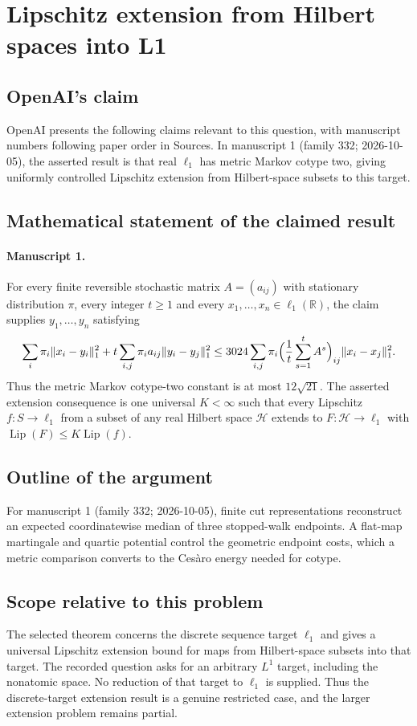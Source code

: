\documentclass[11pt]{article}
\begin{document}
\section*{Lipschitz extension from Hilbert spaces into L1}

\subsection{OpenAI's claim}
OpenAI presents the following claims relevant to this question, with manuscript numbers following paper order in Sources. In manuscript 1 (family 332; 2026-10-05), the asserted result is that real $\ell_1$ has metric Markov cotype two, giving uniformly controlled Lipschitz extension from Hilbert-space subsets to this target.

\subsection{Mathematical statement of the claimed result}
\paragraph{Manuscript 1.}
For every finite reversible stochastic matrix $A=(a_{ij})$ with stationary distribution $\pi$, every integer $t\ge1$ and every $x_1,\ldots,x_n\in\ell_1(\mathbb R)$, the claim supplies $y_1,\ldots,y_n$ satisfying
\[
 \sum_i\pi_i\|x_i-y_i\|_1^2+t\sum_{i,j}\pi_i a_{ij}\|y_i-y_j\|_1^2
 \le3024\sum_{i,j}\pi_i\Bigl(\frac1t\sum_{s=1}^tA^s\Bigr)_{ij}\|x_i-x_j\|_1^2.
\]
Thus the metric Markov cotype-two constant is at most $12\sqrt{21}$. The asserted extension consequence is one universal $K<\infty$ such that every Lipschitz $f:S\to\ell_1$ from a subset of any real Hilbert space $\mathcal H$ extends to $F:\mathcal H\to\ell_1$ with $\operatorname{Lip}(F)\le K\operatorname{Lip}(f)$.

\subsection{Outline of the argument}
For manuscript 1 (family 332; 2026-10-05), finite cut representations reconstruct an expected coordinatewise median of three stopped-walk endpoints. A flat-map martingale and quartic potential control the geometric endpoint costs, which a metric comparison converts to the Ces\`aro energy needed for cotype.

\subsection{Scope relative to this problem}
The selected theorem concerns the discrete sequence target $\ell_1$ and gives a universal Lipschitz extension bound for maps from Hilbert-space subsets into that target. The recorded question asks for an arbitrary $L^1$ target, including the nonatomic space. No reduction of that target to $\ell_1$ is supplied. Thus the discrete-target extension result is a genuine restricted case, and the larger extension problem remains partial.
\end{document}
